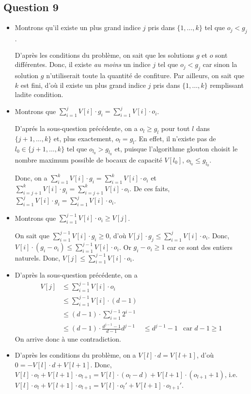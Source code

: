 \documentclass[12pt,a4paper]{article}
\begin{document}
\subsection*{Question 9}
\begin{itemize}[a)]
 \item Montrons qu'il existe un plus grand indice $j$ pris dans $\{1,\dotsc,k\}$ tel que $o_j < g_j$.
 
 D'apr\`es les conditions du probl\`eme, on sait que les solutions $g$ et $o$ sont diff\'erentes. Donc, il existe {\itshape au moins} un indice $j$ tel que $o_j < g_j$ car sinon la solution $g$ n'utiliserait toute la quantit\'e de confiture. Par ailleurs, on sait que $k$ est fini, d'o\`u il existe un plus grand indice $j$ pris dans $\{1,\dotsc,k\}$ remplissant ladite condition.
 
 \item Montrons que \( \displaystyle\sum_{i=1}^{j} V[i]\cdot g_i = \displaystyle\sum_{i=1}^{j} V[i]\cdot o_i\).
 
 D'apr\'es la sous-question pr\'ec\'edente, on a $o_l \geq g_l$ pour tout $l$ dans $\{j+1,\dotsc, k\}$ et, plus exactement, $o_l = g_l$. En effet, il n'existe pas de $l_0 \in \{j+1,\dotsc, k\}$ tel que $o_l_0 > g_l_0$ et, puisque l'algorithme glouton choisit le nombre maximum possible de bocaux de capacit\'e $V[l_0]$, $o_l_0 \leq g_l_0$.
 
 Donc, on a \( \displaystyle\sum_{i=1}^{k} V[i]\cdot g_i = \displaystyle\sum_{i=1}^{k} V[i]\cdot o_i\) et \( \displaystyle\sum_{i=j+1}^{k} V[i]\cdot g_i = \displaystyle\sum_{i=j+1}^{k} V[i]\cdot o_i\). De ces faits, \( \displaystyle\sum_{i=1}^{j} V[i]\cdot g_i = \displaystyle\sum_{i=1}^{j} V[i]\cdot o_i\).
 
 \item Montrons que \( \displaystyle\sum_{i=1}^{j-1} V[i]\cdot o_i \geq V[j]\).
 
 On sait que \( \displaystyle\sum_{i=1}^{j-1} V[i]\cdot g_i \geq 0\), d'o\`u \( V[j]\cdot g_j \leq \displaystyle\sum_{i=1}^{j} V[i]\cdot o_i\). Donc, \( V[i]\cdot (g_i - o_i) \leq \displaystyle\sum_{i=1}^{j-1} V[i]\cdot o_i\). Or $g_i - o_i \geq 1$ car ce sont des entiers naturels. Donc, \( V[j] \leq \displaystyle\sum_{i=1}^{j-1} V[i]\cdot o_i\).
 
 \item D'apr\`es la sous-question pr\'ec\'edente, on a 
 \begin{alignat*}[1]
 	V[j] &\leq \displaystyle\sum_{i=1}^{j-1} V[i]\cdot o_i \\
 		 &\leq \displaystyle\sum_{i=1}^{j-1} V[i]\cdot (d-1) \\
 		 &\leq (d-1)\cdot \displaystyle\sum_{i=1}^{j-1} 2^{i-1} \\
 		 &\leq (d-1)\cdot \frac{d^{j-1}-1}{d-1}
 	d^{j-1}	 &\leq d^{j-1}-1 & \text{car } d-1 \geq 1
 \end{alignat*}
 On arrive donc \`a une contradiction. 
 \item D'apr\`es les conditions du probl\`eme, on a \( V[l]\cdot d = V[l+1] \), d'o\`u \( 0 = -V[l]\cdot d + V[l+1] \).
 Donc, \( V[l]\cdot o_l + V[l+1]\cdot o_{l+1} = V[l]\cdot (o_l-d) + V[l+1]\cdot (o_{l+1} + 1)\), i.e.\ \( V[l]\cdot o_l + V[l+1]\cdot o_{l+1} = V[l]\cdot o_l' + V[l+1]\cdot o_{l+1}'\).
  

\end{itemize}
\end{document}

